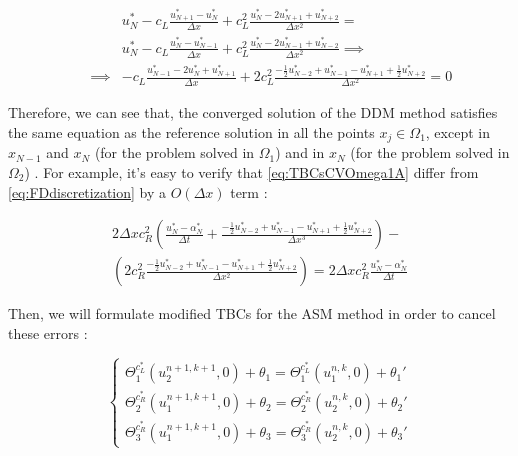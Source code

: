 \begin{equation}
    \label{eq:TBCsCVOmega2}
\begin{aligned}
   && 					&	 u_N^* -  c_L\frac{u_{N+1}^* - u_{N}^*}{\Delta x} + c_L^2 \frac{u_{N}^* - 2u_{N+1}^* + u_{N+2}^*}{\Delta x^2} = \\ 
   && 					& u_N^* -  c_L\frac{u_{N}^* - u_{N-1}^*}{\Delta x} + c_L^2 \frac{u_{N}^* - 2u_{N-1}^* + u_{N-2}^*}{\Delta x^2} \implies \\
	&&  \implies	    & -c_L\frac{u_{N-1}^* - 2 u_{N}^* + u_{N+1}^*}{\Delta x} + 2c_L^2\frac{-\frac{1}{2}u_{N-2}^* + u_{N-1}^* - u_{N+1}^* + \frac{1}{2}u_{N+2}^* }{\Delta x^2} = 0 
\end{aligned}
\end{equation}

\indent Therefore, we can see that, the converged solution of the DDM method satisfies the same equation as the reference solution in all the points $x_j \in \Omega_1$, except in $x_{N-1}$ and $x_N$ (for the problem solved in $\Omega_1$) and in $x_N$ (for the problem solved in $\Omega_2$) . For example, it's easy to verify that \eqref{eq:TBCsCVOmega1A} differ from \eqref{eq:FDdiscretization} by a $O(\Delta x)$ term :

\begin{equation}
    \label{eq:diffEquations}
    \begin{aligned}
    2\Delta x c_R^2\left( \frac{u_N^* - \alpha_N^*}{\Delta t} + \frac{-\frac{1}{2}u_{N-2}^* + u_{N-1}^* - u_{N+1}^* + \frac{1}{2}u_{N+2}^* }{\Delta x ^3} \right) - \\
    \left( 2c_R^2 \frac{-\frac{1}{2}u_{N-2}^* + u_{N-1}^* - u_{N+1}^* + \frac{1}{2}u_{N+2}^* }{\Delta x^2} \right) =  2\Delta x c_R^2 \frac{u_N^* - \alpha_N^*}{\Delta t}
    \end{aligned}
\end{equation}

\indent Then, we will formulate modified TBCs for the ASM method in order to cancel these errors :

\begin{equation}
    \begin{cases}
        \Theta_1^{c_L^*}(u_2^{n+1,k+1},0) + \theta_1 = \Theta_1^{c_L^*}(u_1^{n,k},0) + \theta_1' \\
        \Theta_2^{c_R^*}(u_1^{n+1,k+1},0) + \theta_2 = \Theta_2^{c_R^*}(u_2^{n,k},0) + \theta_2' \\
        \Theta_3^{c_R^*}(u_1^{n+1,k+1},0) + \theta_3 = \Theta_3^{c_R^*}(u_2^{n,k},0) + \theta_3'
    \end{cases}
\end{equation}

